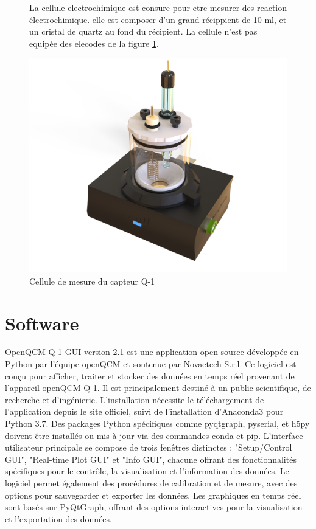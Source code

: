 \begin{figure}[H]
    \centering
    \begin{minipage}{0.48\textwidth}
        \small
        La cellule electrochimique est consure pour etre mesurer des reaction électrochimique.
        elle est composer d'un grand récippient de 10 ml, et un cristal de quartz au fond du récipient.
        La cellule n'est pas equipée des elecodes de la figure \ref{fig:cellule electrolitique Q-1}.
    \end{minipage}\hfill
    \begin{minipage}{0.48\textwidth}
        \centering
        \includegraphics[width=\textwidth]{assets/figures/E-QCM_Module-openQCM-Q-1__71326.png}
        \caption{Cellule de mesure du capteur Q-1}
        \label{fig:cellule electrolitique Q-1}
    \end{minipage}
\end{figure}

\section{Software}
OpenQCM Q-1 GUI version 2.1 est une application open-source développée en Python par l'équipe openQCM et soutenue par Novaetech S.r.l. Ce logiciel est conçu pour afficher, traiter et stocker des données en temps réel provenant de l'appareil openQCM Q-1. Il est principalement destiné à un public scientifique, de recherche et d'ingénierie. L'installation nécessite le téléchargement de l'application depuis le site officiel, suivi de l'installation d'Anaconda3 pour Python 3.7. Des packages Python spécifiques comme pyqtgraph, pyserial, et h5py doivent être installés ou mis à jour via des commandes conda et pip. L'interface utilisateur principale se compose de trois fenêtres distinctes : "Setup/Control GUI", "Real-time Plot GUI" et "Info GUI", chacune offrant des fonctionnalités spécifiques pour le contrôle, la visualisation et l'information des données. Le logiciel permet également des procédures de calibration et de mesure, avec des options pour sauvegarder et exporter les données. Les graphiques en temps réel sont basés sur PyQtGraph, offrant des options interactives pour la visualisation et l'exportation des données.

